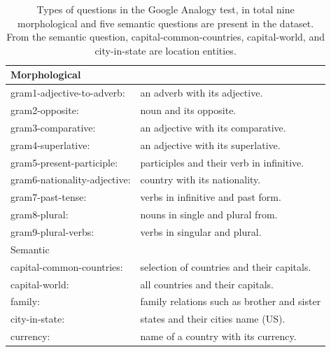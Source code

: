 \begin{table}[h]
\centering
\caption{Types of questions in the Google Analogy test, in total nine
  morphological and five semantic questions are present in the dataset. From the semantic question, capital-common-countries, capital-world, and city-in-state are location entities.} 
  \label{table:analogy_types}
\begin{tabular}{ll}
        \toprule
{Morphological} & \\         \midrule

gram1-adjective-to-adverb:& an adverb with its adjective.            \\ \hline
gram2-opposite: &noun and its opposite.                          \\ \hline
gram3-comparative: & an adjective with its comparative.                                           \\ \hline
gram4-superlative:&an adjective with its superlative.                                                    \\ \hline
gram5-present-participle:&participles and their verb in infinitive.                                           \\ \hline
gram6-nationality-adjective:&country with its nationality.                                                                \\ \hline
gram7-past-tense: &verbs in infinitive and past form.                                                             \\ \hline
gram8-plural:& nouns in single and plural from.                                                         \\ \hline
gram9-plural-verbs: &verbs in singular and plural.                                                          \\ 
\midrule
\midrule
{Semantic}&\\   
\midrule

capital-common-countries:                 &           selection of countries and their capitals.\\ \hline
capital-world:          &        all countries and their capitals.    \\ \hline
family:     &             family relations such as brother and sister  \\ \hline
city-in-state:   &      states and their cities name (US). \\ \hline
currency:    &        name of a country with its currency.  \\
\bottomrule
\end{tabular}
\end{table}
